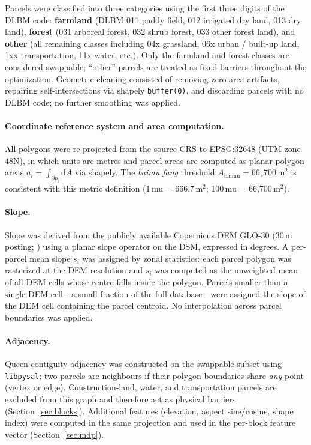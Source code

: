 \documentclass[preprint,12pt]{elsarticle}
\begin{document}
Parcels were classified into three categories using the first three digits of the DLBM code: \textbf{farmland} (DLBM 011 paddy field, 012 irrigated dry land, 013 dry land), \textbf{forest} (031 arboreal forest, 032 shrub forest, 033 other forest land), and \textbf{other} (all remaining classes including 04x grassland, 06x urban / built-up land, 1xx transportation, 11x water, etc.). Only the farmland and forest classes are considered swappable; ``other'' parcels are treated as fixed barriers throughout the optimization. Geometric cleaning consisted of removing zero-area artifacts, repairing self-intersections via shapely \texttt{buffer(0)}, and discarding parcels with no DLBM code; no further smoothing was applied.

\paragraph{Coordinate reference system and area computation.} All polygons were re-projected from the source CRS to EPSG:32648 (UTM zone 48N), in which units are metres and parcel areas are computed as planar polygon areas $a_i = \int_{\partial p_i} \mathrm{d}A$ via shapely. The \textit{baimu fang} threshold $A_{\text{baimu}} = 66{,}700\,\text{m}^2$ is consistent with this metric definition (1\,mu = 666.7\,m$^2$; 100\,mu = 66{,}700\,m$^2$).

\paragraph{Slope.} Slope was derived from the publicly available Copernicus DEM GLO-30 (30\,m posting; \citealt{copernicus2021dem}) using a planar slope operator on the DSM, expressed in degrees. A per-parcel mean slope $s_i$ was assigned by zonal statistics: each parcel polygon was rasterized at the DEM resolution and $s_i$ was computed as the unweighted mean of all DEM cells whose centre falls inside the polygon. Parcels smaller than a single DEM cell---a small fraction of the full database---were assigned the slope of the DEM cell containing the parcel centroid. No interpolation across parcel boundaries was applied.

\paragraph{Adjacency.} Queen contiguity adjacency was constructed on the swappable subset using \texttt{libpysal}; two parcels are neighbours if their polygon boundaries share \emph{any} point (vertex or edge). Construction-land, water, and transportation parcels are excluded from this graph and therefore act as physical barriers (Section~\ref{sec:blocks}). Additional features (elevation, aspect sine/cosine, shape index) were computed in the same projection and used in the per-block feature vector (Section~\ref{sec:mdp}).
\end{document}
